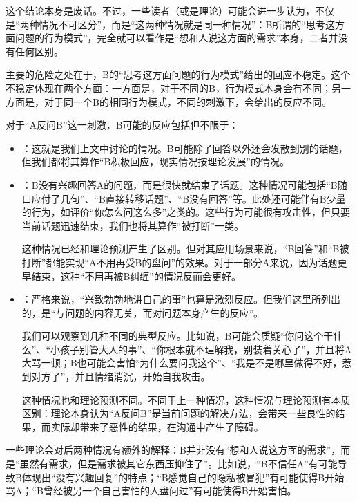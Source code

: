 \begin{explain}
这个结论本身是废话。不过，一些读者（或是理论）可能会进一步认为，不仅是“两种情况不可区分”，而是“这两种情况就是同一种情况”：B所谓的“思考这方面问题的行为模式”，完全就可以看作是“想和人说这方面的需求”本身，二者并没有任何区别。
\vspace{0.5em}
\insertparanotes
\vspace{0.5em}
\end{explain}
\begin{explain}
主要的危险之处在于，B的“思考这方面问题的行为模式”给出的回应不稳定。这个不稳定体现在两个方面：一方面是，对于不同的B，行为模式本身会有不同；另一方面是，对于同一个B的相同行为模式，不同的刺激下，会给出的反应不同。

对于“A反问B”这一刺激，B可能的反应包括但不限于：
\begin{itemize}
\item {}：这就是我们上文中讨论的情况。B可能除了回答以外还会发散到别的话题，但我们都将其算作“B积极回应，现实情况按理论发展”的情况。
\item {}：B没有兴趣回答A的问题，而是很快就结束了话题。这种情况可能包括“B随口应付了几句”、“B直接转移话题”、“B没有回答”等。此处还可能伴有B少量的行为，如评价“你怎么问这么多”之类的。这些行为可能很有攻击性，但只要当前话题迅速结束，我们也将其算作“被打断”一类。

这种情况已经和理论预测产生了区别。但对其应用场景来说，“B回答”和“B被打断”都能实现“A不用再受B的盘问”的效果。对于一部分A来说，因为话题更早结束，这种“不用再被B纠缠”的情况反而会更好。
\item {}：严格来说，“兴致勃勃地讲自己的事”也算是激烈反应。但我们这里所列出的，是“与问题的内容无关，而对问题本身产生的反应”。

我们可以观察到几种不同的典型反应。比如说，B可能会质疑“你问这个干什么”、“小孩子别管大人的事”、“你根本就不理解我，别装着关心了”，并且将A大骂一顿；B也可能会害怕“为什么要问我这个”、“我是不是哪里做得不好，惹到对方了”，并且情绪消沉，开始自我攻击。

这种情况也和理论预测不同。不同于上一种情况，这种情况与理论预测有本质区别：理论本身认为“A反问B”是当前问题的解决方法，会带来一些良性的结果，而实际却带来了恶性的结果，在沟通中产生了障碍。
\insertparanotes
\end{itemize}
一些理论会对后两种情况有额外的解释：B并非没有“想和人说这方面的需求”，而是“虽然有需求，但是需求被其它东西压抑住了”。比如说，“B不信任A”有可能导致B体现出“没有兴趣回复”的特点；“B感觉自己的隐私被冒犯”有可能使得B开始骂A；“B曾经被另一个自己害怕的人盘问过”有可能使得B开始害怕。
\end{explain}
